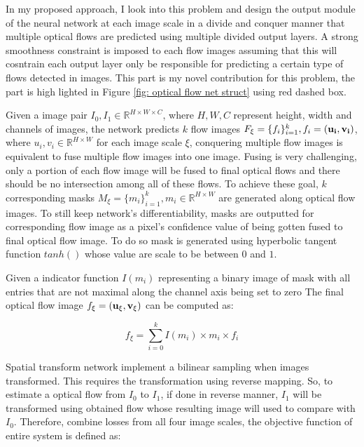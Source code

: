 \documentclass{iitthesis}
\begin{document}
In my proposed approach, I look into this problem and design the output module of the neural network at each image scale in a divide and conquer manner that multiple optical flows are predicted using multiple divided output layers. A strong smoothness constraint is imposed to each flow images assuming that this will cosntrain each output layer only be responsible for predicting a certain type of flows detected in images. This part is my novel contribution for this problem, the part is high lighted in Figure \ref{fig: optical flow net struct} using red dashed box.

Given a image pair $I_0, I_1\in \mathbb{R}^{H\times W\times C}$, where $H, W, C$ represent height, width and channels of images, the network predicts $k$ flow images $F_{\xi}= \{f_i\}_{i=1}^k, f_i = (\bold{u_i}, \bold{v_i})$, where $u_i, v_i\in \mathbb{R}^{H\times W}$ for each image scale $\xi$, conquering multiple flow images is equivalent to fuse multiple flow images into one image. Fusing is very challenging, only a portion of each flow image will be fused to final optical flows and there should be no intersection among all of these flows. To achieve these goal, $k$ corresponding masks $M_{\xi}=\{m_i\}_{i=1}^k, m_i \in \mathbb{R}^{H\times W}$ are generated along optical flow images. To still keep network's differentiability, masks are outputted for corresponding flow image as a pixel's confidence value of being gotten fused to final optical flow image. To do so mask is generated using hyperbolic tangent function $tanh()$ whose value are scale to be between $0$ and $1$. 

Given a indicator function $I(m_i)$ representing a binary image of mask with all entries that are not maximal along the channel axis being set to zero The final optical flow image $f_{\xi}=(\bold{u}_{\xi}, \bold{v}_{\xi})$ can be computed as:

\begin{equation}
\label{eqn: fuse optical flow}
f_{\xi} = \sum_{i=0}^k I(m_i)\times m_i \times f_i
\end{equation} 

Spatial transform network \cite{NIPS2015_5854} implement a bilinear sampling when images transformed. This requires the transformation using reverse mapping. So, to estimate a optical flow from $I_0$ to $I_1$, if done in reverse manner, $I_1$ will be transformed using obtained flow whose resulting image will used to compare with $I_0$. Therefore, combine losses from all four image scales, the objective function of entire system is defined as:
\end{document}
